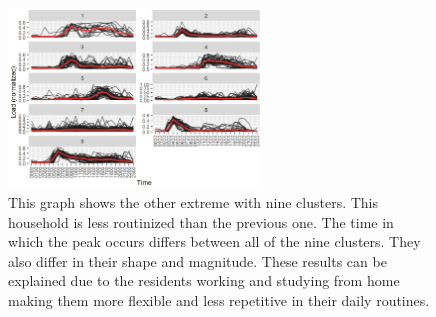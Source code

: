 \begin{figure}
    \centering
    \includegraphics[width=0.6\textwidth]{figures/malatesta_hsop/malatesta_unroutinisedHousehold.jpg}
    \caption{This graph shows the other extreme with nine clusters.
    This household is less routinized than the previous one.
    The time in which the peak occurs differs between all of the nine clusters.
    They also differ in their shape and magnitude.
    These results can be explained due to the residents working and studying from home making them more flexible and less repetitive in their daily routines.
    }
    \label{fig:non_routinized_household}
\end{figure}




